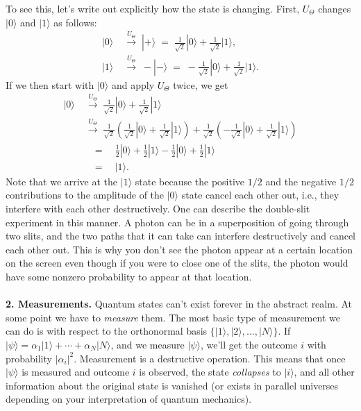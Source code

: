 \documentclass[12pt]{report}
\theoremstyle{plain}
\theoremstyle{definition}
\renewcommand{\ket}[1]{|#1\rangle}
\begin{document}
To see this, let's write out explicitly how the state is changing. First, $U_\Theta$ changes $\ket{0}$ and $\ket{1}$ as follows:
\begin{align*}
\ket{0} \; &  \overset{U_\Theta}{\longrightarrow} \; \ket{+}  \; = \; \frac{1}{\sqrt{2}} \ket{0} + \frac{1}{\sqrt{2}} \ket{1}, \\
\ket{1} \; &  \overset{U_\Theta}{\longrightarrow} \; -\ket{-}  \; = \; -\frac{1}{\sqrt{2}} \ket{0} + \frac{1}{\sqrt{2}} \ket{1}.
\end{align*}
If we then start with $\ket{0}$ and apply $U_\Theta$ twice, we get
\begin{align*}
\ket{0}  & \; \overset{U_\Theta}{\longrightarrow} \; \frac{1}{\sqrt{2}} \ket{0} + \frac{1}{\sqrt{2}} \ket{1} \\
            & \; \overset{U_\Theta}{\longrightarrow} \; \frac{1}{\sqrt{2}} \left( \frac{1}{\sqrt{2}} \ket{0} + \frac{1}{\sqrt{2}} \ket{1} \right ) + \frac{1}{\sqrt{2}} \left(  -\frac{1}{\sqrt{2}} \ket{0} + \frac{1}{\sqrt{2}} \ket{1} \right ) \\
            & \quad = \quad \frac{1}{2}\ket{0} + \frac{1}{2} \ket{1} - \frac{1}{2}\ket{0} + \frac{1}{2}\ket{1} \\
            & \quad = \quad \ket{1}.
\end{align*}
Note that we arrive at the $\ket{1}$ state because the positive $1/2$ and the negative $1/2$ contributions to the amplitude of the $\ket{0}$ state cancel each other out, i.e., they interfere with each other destructively. One can describe the double-slit experiment in this manner. A photon can be in a superposition of going through two slits, and the two paths that it can take can interfere destructively and cancel each other out. This is why you don't see the photon appear at a certain location on the screen even though if you were to close one of the slits, the photon would have some nonzero probability to appear at that location.
\\\\
\noindent
{\bf 2. Measurements.} Quantum states can't exist forever in the abstract realm. At some point we have to \emph{measure} them. The most basic type of measurement we can do is with respect to the orthonormal basis $\{\ket{1}, \ket{2}, \ldots, \ket{N}\}$. If $\ket{\psi} = \alpha_1 \ket{1} + \cdots + \alpha_N \ket{N}$, and we measure $\ket{\psi}$, we'll get the outcome $i$ with probability $|\alpha_i|^2$. Measurement is a destructive operation. This means that once $\ket{\psi}$ is measured and outcome $i$ is observed, the state \emph{collapses} to $\ket{i}$, and all other information about the original state is vanished (or exists in parallel universes depending on your interpretation of quantum mechanics).
\end{document}
